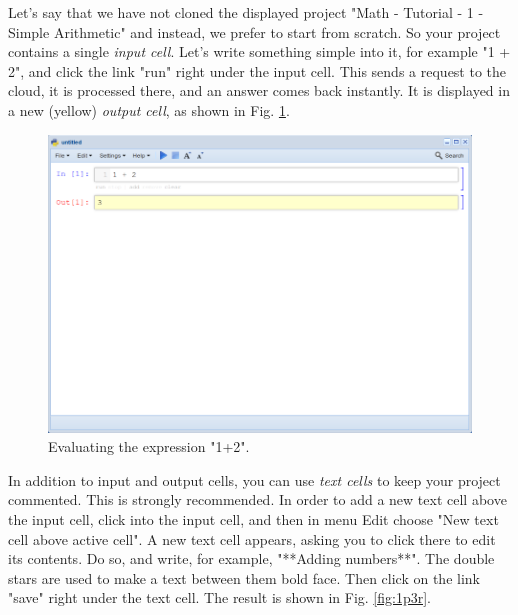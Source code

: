 \documentclass{article}
\begin{document}
Let's say that we have not cloned the displayed project "Math - Tutorial - 1 - Simple Arithmetic"
and instead, we prefer to start from scratch.
So your project contains a single {\em input cell}. Let's write 
something simple into it, for example "1 + 2", and click 
the link "run" right under the input cell. This sends a request to 
the cloud, it is processed there, and an answer comes back instantly. 
It is displayed in a new (yellow) {\em output cell}, as shown in 
Fig. \ref{fig:1p3}.

\begin{figure}[!ht]
\begin{center}
\includegraphics[width=\textwidth]{img/1p2.png}
\end{center}
\caption{Evaluating the expression "1+2".}
\label{fig:1p3}
\end{figure}
\noindent
\noindent
In addition to input and output cells, you can use {\em text cells}
to keep your project commented. This is strongly recommended. In
order to add a new text cell above the input cell, click into
the input cell, and then in menu Edit choose "New text cell above
active cell". A new text cell appears, asking you to click there to
edit its contents. Do so, and write, for example, "**Adding numbers**".
The double stars are used to make a text between them bold face. 
Then click on the link "save" right under the text cell. The result 
is shown in Fig. \ref{fig:1p3r}.

\newpage
\end{document}
